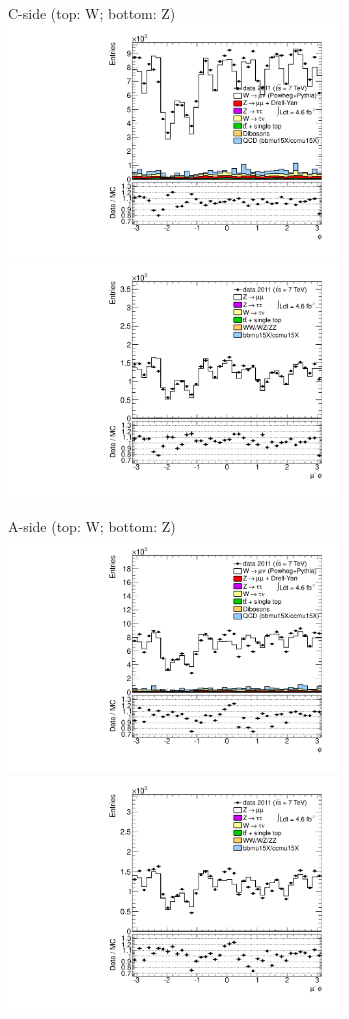 {

\colb[T]

C-side (top: W; bottom: Z)
\centering
\includegraphics[width=0.66\textwidth]{dates/20130306/figures/etaphi/W_3_C_stack_l_phi_NEG} \\
\includegraphics[width=0.66\textwidth]{dates/20130306/figures/etaphi/Z_3_C_stack_lN_phi_ALL.pdf}

A-side (top: W; bottom: Z)
\centering
\includegraphics[width=0.66\textwidth]{dates/20130306/figures/etaphi/W_3_A_stack_l_phi_NEG} \\
\includegraphics[width=0.66\textwidth]{dates/20130306/figures/etaphi/Z_3_A_stack_lN_phi_ALL.pdf} 

\cole
}


